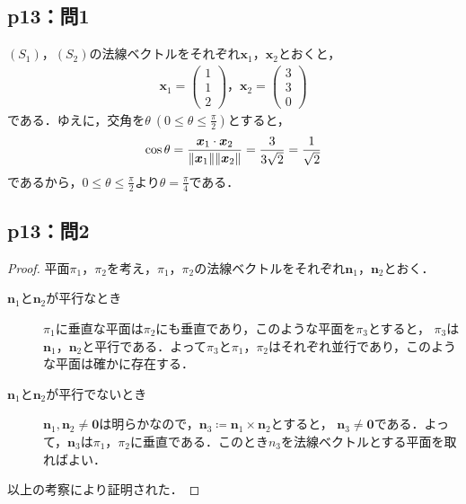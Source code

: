 \documentclass[uplatex,dvipdfmx,a4paper,11pt,fleqn]{jsarticle}
\begin{document}
\subsection*{p13：問1}
%
\begin{tleftbar}
    $(S_1)$，$(S_2)$の法線ベクトルをそれぞれ$\bm{x}_1$，$\bm{x}_2$とおくと，
    \begin{gather*}
        \bm{x}_1 =
            \begin{pmatrix}
                1\\
                1\\
                2
            \end{pmatrix}
        ，
        \bm{x}_2 =
            \begin{pmatrix}
                3\\
                3\\
                0
            \end{pmatrix}
        \end{gather*}
        である．ゆえに，交角を$\theta ~(0 \le \theta \le \frac{\pi}{2})$とすると，
        \[
            \cos \theta = \frac{\bm{x}_1 \cdot \bm{x}_2}{\norm{\bm{x}_1} \norm{\bm{x}_2}}=\frac{3}{3\sqrt{2}}=\frac{1}{\sqrt{2}}
        \]
        であるから，$0 \le \theta \le \frac{\pi}{2}$より$\theta =\frac{\pi}{4}$である．
    \end{tleftbar}
%
\subsection*{p13：問2}

\begin{tleftbar}
    \begin{proof}
    平面$\pi_1$，$\pi_2$を考え，$\pi_1$，$\pi_2$の法線ベクトルをそれぞれ$\bm{n}_1$，$\bm{n}_2$とおく．
    \begin{description}
        \item[$\bm{n}_1$と$\bm{n}_2$が平行なとき]
        $\pi_1$に垂直な平面は$\pi_2$にも垂直であり，このような平面を$\pi_3$とすると，
        $\pi_3$は$\bm{n}_1$，$\bm{n}_2$と平行である．よって$\pi_3$と$\pi_1$，$\pi_2$はそれぞれ並行であり，このような平面は確かに存在する．
        \item[$\bm{n}_1$と$\bm{n}_2$が平行でないとき]
        $\bm{n}_1 , \bm{n}_2 \ne \bm{0}$は明らかなので，$\bm{n}_3 \coloneqq \bm{n}_1 \times \bm{n}_2$とすると，
        $\bm{n}_3 \ne \bm{0}$である．よって，$\bm{n}_3$は$\pi_1$，$\pi_2$に垂直である．このとき$n_3$を法線ベクトルとする平面を取ればよい．
    \end{description}
    以上の考察により証明された．
\end{proof}
\end{tleftbar}
\newpage
%
%
%
\end{document}
